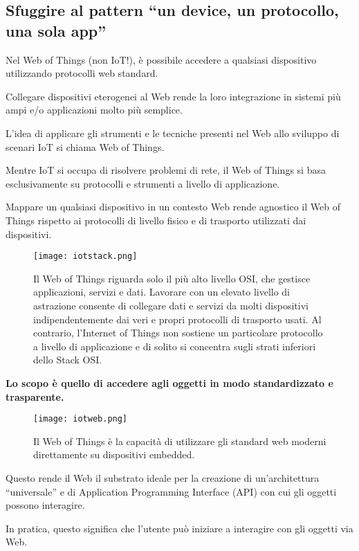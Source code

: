 \subsection{Sfuggire al pattern ``un device, un protocollo, una sola app''}

Nel Web of Things (non IoT!), è possibile accedere a qualsiasi dispositivo
utilizzando protocolli web standard.

Collegare dispositivi eterogenei al Web rende la loro integrazione in sistemi
più ampi e/o applicazioni molto più semplice.

L'idea di applicare gli strumenti e le tecniche presenti nel
Web allo sviluppo di scenari IoT si chiama Web of Things.

Mentre IoT si occupa di risolvere problemi di rete, il Web of Things si basa
esclusivamente su protocolli e strumenti a livello di applicazione.

Mappare un qualsiasi dispositivo in un contesto Web rende agnostico il
Web of Things rispetto ai protocolli di livello fisico e di trasporto
utilizzati dai dispositivi.

\begin{figure}[H]
  \centering
  \texttt{[image: iotstack.png]}
  \caption{Il Web of Things riguarda solo il più alto livello OSI, che
gestisce applicazioni, servizi e dati.
Lavorare con un elevato livello di astrazione consente di collegare dati
e servizi da molti dispositivi indipendentemente dai veri e propri protocolli
di trasporto usati.
Al contrario, l'Internet of Things non sostiene un particolare protocollo a
livello di applicazione e di solito si concentra sugli strati inferiori dello
Stack OSI.}
  \label{fig:iotstack}
\end{figure}

\textbf{Lo scopo è quello di accedere agli oggetti in modo standardizzato e
trasparente.}

\begin{figure}[H]
  \centering
  \texttt{[image: iotweb.png]}
  \caption{Il Web of Things è la capacità di utilizzare gli standard web moderni
direttamente su dispositivi embedded.}
  \label{fig:iotweb}
\end{figure}

Questo rende il Web il substrato ideale per la creazione di un'architettura
``universale'' e di Application Programming Interface (API) con cui gli oggetti possono
interagire.

In pratica, questo significa che l'utente può iniziare a interagire con gli oggetti
via Web.

